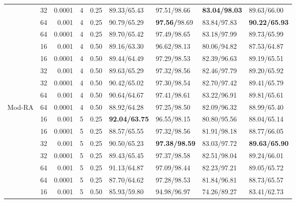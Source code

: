 \begin{table}
\begin{tabular}{l|rr|rr|llll}
                & 32    & 0.0001    & 4  & 0.25     & 89.33/65.43   & 97.51/98.66    & \textbf{83.04/98.03}   & 89.63/66.00    \\
                & 64    & 0.001     & 4  & 0.25     & 90.79/65.29   & \textbf{97.56/}98.69    & 83.84/97.83   & \textbf{90.22/65.93}   \\
                & 64    & 0.0001    & 4  & 0.25     & 89.70/65.42   & 97.49/98.65    & 83.18/97.99   & 89.73/65.99   \\
                & 16    & 0.001     & 4  & 0.50     & 89.16/63.30   & 96.62/98.13    & 80.06/94.82   & 87.53/64.87   \\
                & 16    & 0.0001    & 4  & 0.50     & 89.44/64.49   & 97.29/98.53    & 82.39/96.63   & 89.19/65.51   \\
                & 32    & 0.001     & 4  & 0.50     & 89.63/65.29   & 97.32/98.56    & 82.46/97.79   & 89.20/65.92    \\
                & 32    & 0.0001    & 4  & 0.50     & 90.42/65.02   & 97.30/98.54    & 82.70/97.42   & 89.41/65.79   \\
                & 64    & 0.001     & 4  & 0.50     & 90.64/64.67   & 97.41/98.61    & 83.22/96.91   & 89.81/65.61   \\
                Mod-RA & 64    & 0.0001    & 4  & 0.50     & 88.92/64.28   & 97.25/98.50    & 82.09/96.32   & 88.99/65.40   \\
                \midrule
                & 16    & 0.001     & 5  & 0.25     & \textbf{92.04/63.75}   & 96.55/98.15    & 80.80/95.56   & 88.04/65.14   \\
                & 16    & 0.0001    & 5  & 0.25     & 88.57/65.55   & 97.32/98.56    & 81.91/98.18   & 88.77/66.05   \\
                & 32    & 0.001     & 5  & 0.25     & 90.50/65.23   & \textbf{97.38/98.59}    & 83.03/97.72   & \textbf{89.63/65.90}   \\
                & 32    & 0.0001    & 5  & 0.25     & 89.43/65.45   & 97.37/98.58    & 82.51/98.04   & 89.24/66.01   \\
                & 64    & 0.001     & 5  & 0.25     & 91.13/64.87   & 97.09/98.44    & 82.23/97.21   & 89.05/65.72   \\
                & 64    & 0.0001    & 5  & 0.25     & 87.70/64.62   & 97.28/98.53    & 81.84/96.81   & 88.73/65.57   \\
                & 16    & 0.001     & 5  & 0.50     & 85.93/59.80   & 94.98/96.97    & 74.26/89.27   & 83.41/62.73   \\

\end{tabular}
\end{table}

